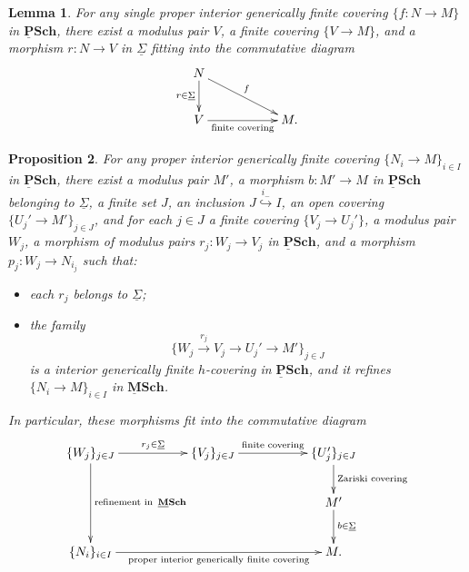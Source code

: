 \documentclass[10pt,a4paper]{amsart}
\theoremstyle{plain}
\newtheorem{lemma}{Lemma}
\newtheorem{prop}[lemma]{Proposition}
\newcommand{\ul}[1]{{\underline{#1}}}
\newcommand{\ulPSCH}{\operatorname{\mathbf{\underline{P}Sch}}}
\newcommand{\ulMSCH}{\operatorname{\mathbf{\underline{M}Sch}}}
\begin{document}
\begin{lemma}\label{singlelemma}
For any single proper interior generically finite covering $\{f:N \to M\}$ in $\ulPSCH$, there exist a modulus pair $V$, a finite covering $\{V\to M\}$, and a morphism $r:N \to V$ in $\ul{\Sigma}$ fitting into the commutative diagram
\[
\xymatrix{
N \ar[d]_-{r \in \ul{\Sigma}} \ar[drr]^-{f}& & \\
V \ar[rr]_-{\text{finite covering}}&  & M.
}
\]
\end{lemma}

\begin{prop}\label{hisqfh}
For any proper interior generically finite covering $\{N_i \to M\}_{i\in I}$ in $\ulPSCH$, there exist a modulus pair $M'$, a morphism $b:M' \to M$ in $\ulPSCH$ belonging to $\ul{\Sigma}$, a finite set $J$, an inclusion $J \overset{i_{-}}{\hookrightarrow} I$, an open covering $\{U_j' \to M'\}_{j\in J}$, and for each $j \in J$ a finite covering $\{V_j \to U_j'\}$, a modulus pair $W_j$, a morphism of modulus pairs $r_j: W_j \to V_j$ in $\ulPSCH$, and a morphism $p_j:W_j \to N_{i_j}$ such that:
\begin{itemize}
    \item[(1)] each $r_j$ belongs to $\ul{\Sigma}$;
    \item[(2)] the family
    \[
    \{W_j \overset{r_j}{\to} V_j \to U_j' \to M' \}_{j\in J}
    \]
    is a interior generically finite $h$-covering in $\ulPSCH$, and it refines $\{N_i \to M\}_{i\in I}$ in $\ulMSCH$.
\end{itemize}
In particular, these morphisms fit into the commutative diagram
\[
\xymatrix{
\{W_j\}_{j\in J}\ar[dd]^-{\text{refinement in }\ulMSCH} \ar[rr]^-{r_j \in \ul{\Sigma}}&& \{V_j\}_{j\in J}\ar[rr]^-{\text{finite covering}} && \{U_j'\}_{j\in J}\ar[d]^-{\text{Zariski covering}} \\
&&&&M' \ar[d]^-{b\in \ul{\Sigma}}\\
\{N_i\}_{i\in I}\ar[rrrr]_-{\text{proper interior generically finite covering}}&& &&M.
}
\]
\end{prop}
\end{document}
